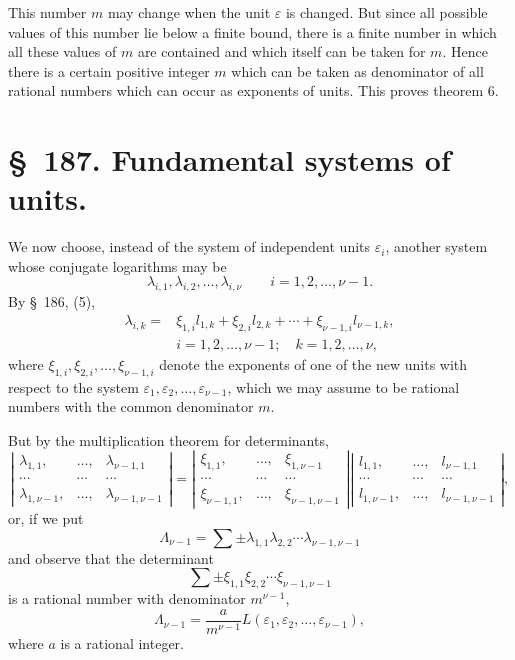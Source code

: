 \documentclass[11pt]{article}
\begin{document}
This number $m$ may change when the unit $\varepsilon$ is changed. But since all possible values of this number lie below a finite bound, there is a finite number in which all these values of $m$ are contained and which itself can be taken for $m$. Hence there is a certain positive integer $m$ which can be taken as denominator of all rational numbers which can occur as exponents of units. This proves theorem 6.

\section*{\S~187. Fundamental systems of units.}

We now choose, instead of the system of independent units $\varepsilon_i$, another system whose conjugate logarithms may be
\begin{equation}
\lambda_{i,1},\lambda_{i,2},\ldots,\lambda_{i,\nu}
\qquad i=1,2,\ldots,\nu-1.
\tag{1}
\end{equation}
By \S~186, (5),
\begin{equation}
\begin{array}{rl}
\lambda_{i,k}={}&\xi_{1,i}l_{1,k}+\xi_{2,i}l_{2,k}+\cdots+\xi_{\nu-1,i}l_{\nu-1,k},\\[2pt]
&i=1,2,\ldots,\nu-1;\quad k=1,2,\ldots,\nu,
\end{array}
\tag{2}
\end{equation}
where $\xi_{1,i},\xi_{2,i},\ldots,\xi_{\nu-1,i}$ denote the exponents of one of the new units with respect to the system $\varepsilon_1,\varepsilon_2,\ldots,\varepsilon_{\nu-1}$, which we may assume to be rational numbers with the common denominator $m$.

But by the multiplication theorem for determinants,
\begin{equation}
\left|\begin{array}{ccc}
\lambda_{1,1},&\ldots,&\lambda_{\nu-1,1}\\
\cdots&\cdots&\cdots\\
\lambda_{1,\nu-1},&\ldots,&\lambda_{\nu-1,\nu-1}
\end{array}\right|
=
\left|\begin{array}{ccc}
\xi_{1,1},&\ldots,&\xi_{1,\nu-1}\\
\cdots&\cdots&\cdots\\
\xi_{\nu-1,1},&\ldots,&\xi_{\nu-1,\nu-1}
\end{array}\right|
\left|\begin{array}{ccc}
l_{1,1},&\ldots,&l_{\nu-1,1}\\
\cdots&\cdots&\cdots\\
l_{1,\nu-1},&\ldots,&l_{\nu-1,\nu-1}
\end{array}\right|,
\tag{3}
\end{equation}
or, if we put
\[
\Lambda_{\nu-1}=\sum\pm\lambda_{1,1}\lambda_{2,2}\cdots\lambda_{\nu-1,\nu-1}
\]
and observe that the determinant
\[
\sum\pm\xi_{1,1}\xi_{2,2}\cdots\xi_{\nu-1,\nu-1}
\]
is a rational number with denominator $m^{\nu-1}$,
\begin{equation}
\Lambda_{\nu-1}=\frac{a}{m^{\nu-1}}L(\varepsilon_1,\varepsilon_2,\ldots,\varepsilon_{\nu-1}),
\tag{4}
\end{equation}
where $a$ is a rational integer.
\end{document}
